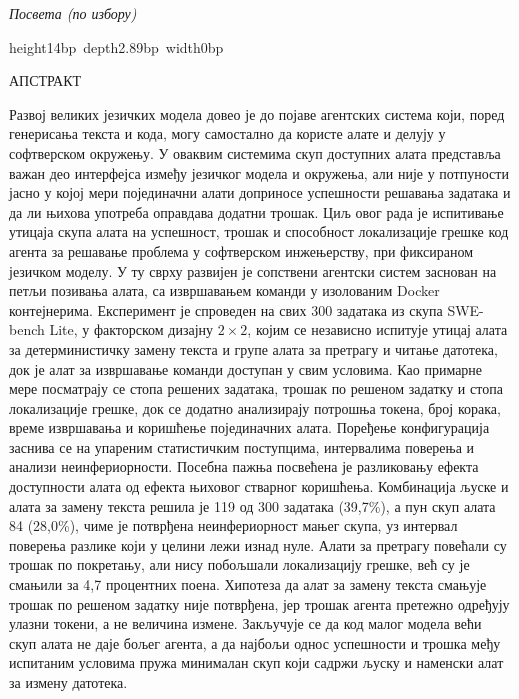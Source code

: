 \documentclass[12pt,a4paper]{report}
\newcommand{\naslovfont}{\normalfont\tahoma\fontsize{14bp}{17.757bp}\selectfont
	\setbox\strutbox\hbox{\vrule height14bp depth2.89bp width0bp}}
\begin{document}
	\newpage
	\thispagestyle{empty}
	\begin{flushright}
		\itshape Посвета (по избору)
	\end{flushright}

	\newpage
	\thispagestyle{empty}
	{\naslovfont\bfseries\rule{0bp}{26bp}АПСТРАКТ\par}
	\vspace{1.8bp}

	Развој великих језичких модела довео је до појаве агентских система који, поред генерисања текста и кода, могу самостално да користе алате и делују у софтверском окружењу. У оваквим системима скуп доступних алата представља важан део интерфејса између језичког модела и окружења, али није у потпуности јасно у којој мери појединачни алати доприносе успешности решавања задатака и да ли њихова употреба оправдава додатни трошак. Циљ овог рада је испитивање утицаја скупа алата на успешност, трошак и способност локализације грешке код агента за решавање проблема у софтверском инжењерству, при фиксираном језичком моделу. У ту сврху развијен је сопствени агентски систем заснован на петљи позивања алата, са извршавањем команди у изолованим Docker контејнерима. Експеримент је спроведен на свих 300 задатака из скупа SWE-bench Lite, у факторском дизајну $2 \times 2$, којим се независно испитује утицај алата за детерминистичку замену текста и групе алата за претрагу и читање датотека, док је алат за извршавање команди доступан у свим условима. Као примарне мере посматрају се стопа решених задатака, трошак по решеном задатку и стопа локализације грешке, док се додатно анализирају потрошња токена, број корака, време извршавања и коришћење појединачних алата. Поређење конфигурација заснива се на упареним статистичким поступцима, интервалима поверења и анализи неинфериорности. Посебна пажња посвећена је разликовању ефекта доступности алата од ефекта њиховог стварног коришћења. Комбинација љуске и алата за замену текста решила је 119 од 300 задатака (39,7\%), а пун скуп алата 84 (28,0\%), чиме је потврђена неинфериорност мањег скупа, уз интервал поверења разлике који у целини лежи изнад нуле. Алати за претрагу повећали су трошак по покретању, али нису побољшали локализацију грешке, већ су је смањили за 4,7 процентних поена. Хипотеза да алат за замену текста смањује трошак по решеном задатку није потврђена, јер трошак агента претежно одређују улазни токени, а не величина измене. Закључује се да код малог модела већи скуп алата не даје бољег агента, а да најбољи однос успешности и трошка међу испитаним условима пружа минималан скуп који садржи љуску и наменски алат за измену датотека.
	
\end{document}
